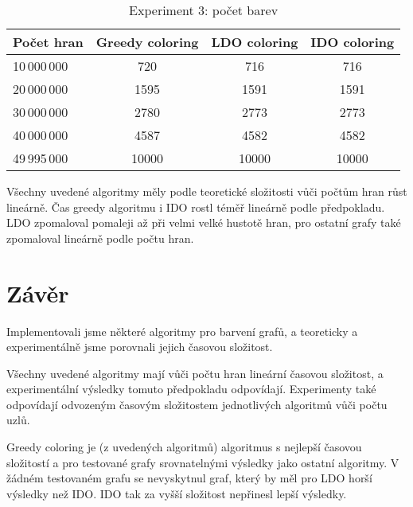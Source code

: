 \documentclass[12pt, a4paper]{article}
\begin{document}
\begin{table}[h!]
  \begin{center}
    \label{tab:table1}
    \begin{tabular}{|l|c|c|c|}
			\hline
      \textbf{Počet hran} & \textbf{Greedy coloring} & \textbf{LDO coloring} & \textbf{IDO coloring}\\
      \hline
       10\,000\,000 & 720  & 716 & 716 \\ \hline
       20\,000\,000 & 1595 & 1591 & 1591 \\ \hline
       30\,000\,000 & 2780 & 2773 & 2773 \\ \hline
       40\,000\,000 & 4587 & 4582 & 4582 \\ \hline
       49\,995\,000 & 10000 & 10000 & 10000 \\ \hline
    \end{tabular}
    \caption{Experiment 3: počet barev}
  \end{center}
\end{table}

Všechny uvedené algoritmy měly podle teoretické složitosti vůči počtům hran růst lineárně.
Čas greedy algoritmu i IDO rostl téměř lineárně podle předpokladu.
LDO zpomaloval pomaleji až při velmi velké hustotě hran, pro ostatní grafy také zpomaloval lineárně podle počtu hran.

\section{Závěr}
Implementovali jsme některé algoritmy pro barvení grafů,
a teoreticky a experimentálně jsme porovnali jejich časovou složitost.

Všechny uvedené algoritmy mají vůči počtu hran lineární časovou složitost, a experimentální výsledky tomuto předpokladu odpovídají.
Experimenty také odpovídají odvozeným časovým složitostem jednotlivých algoritmů vůči počtu uzlů.

Greedy coloring je (z uvedených algoritmů) algoritmus s nejlepší časovou složitostí a pro testované grafy srovnatelnými výsledky jako ostatní algoritmy.
V žádném testovaném grafu se nevyskytnul graf, který by měl pro LDO horší výsledky než IDO.
IDO tak za vyšší složitost nepřinesl lepší výsledky.

\renewcommand\refname{Literatura}

\begin{flushleft}

\end{flushleft}
\end{document}
